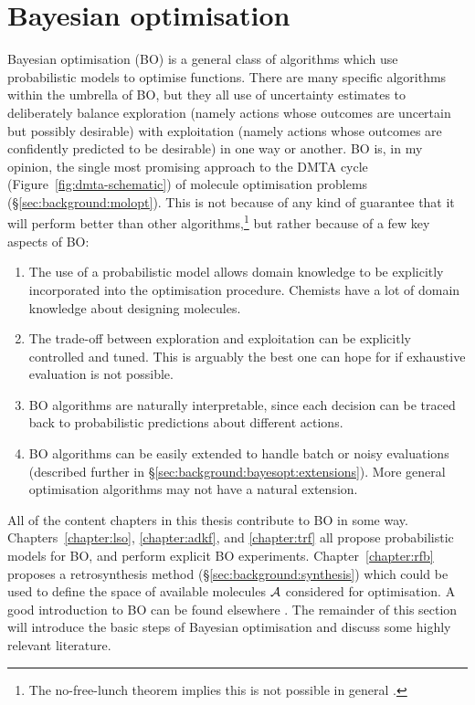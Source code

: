 \section{Bayesian optimisation}
\label{sec:background:bayesopt}

Bayesian optimisation (BO)
is a general class of algorithms which use
probabilistic models to optimise functions.
There are many specific algorithms within the umbrella of BO,
but they all
use of uncertainty estimates to deliberately balance exploration
(namely actions whose outcomes are uncertain but possibly desirable)
with exploitation (namely actions whose outcomes are confidently predicted to be desirable)
in one way or another.
BO is, in my opinion, the single most promising approach to the DMTA cycle (Figure~\ref{fig:dmta-schematic})
of molecule optimisation problems
(\S\ref{sec:background:molopt}).
This is not because of any kind of guarantee that it will perform better than other algorithms,\footnote{
    The no-free-lunch theorem implies this is not possible in general \citep{wolpert1997no}.
}
but rather because of a few key aspects of BO:

\begin{enumerate}
    \item The use of a probabilistic model allows domain knowledge to be explicitly
        incorporated into the optimisation procedure.
        Chemists have a lot of domain knowledge about designing molecules.
    \item The trade-off between exploration and exploitation can be explicitly controlled and tuned.
        This is arguably the best one can hope for if exhaustive evaluation is not possible.
    \item BO algorithms are naturally interpretable,
        since each decision can be traced back to probabilistic predictions about different actions.
    \item BO algorithms can be easily extended to handle batch or noisy evaluations
        (described further in \S\ref{sec:background:bayesopt:extensions}).
        More general optimisation algorithms may not have a natural extension.
\end{enumerate}

All of the content chapters in this thesis contribute to BO in some way.
Chapters~\ref{chapter:lso}, \ref{chapter:adkf}, and \ref{chapter:trf}
all propose probabilistic models for BO, and perform explicit BO experiments.
Chapter~\ref{chapter:rfb} proposes a retrosynthesis method
(\S\ref{sec:background:synthesis})
which could be used to define the space of available molecules $\mathcal{A}$
considered for optimisation.
A good introduction to BO can be found elsewhere
\citep{shahriari2015taking,brochu2010tutorial,frazier2018tutorial,garnett_bayesoptbook_2023}.
The remainder of this section will introduce the basic steps of Bayesian optimisation
and discuss some highly relevant literature.


